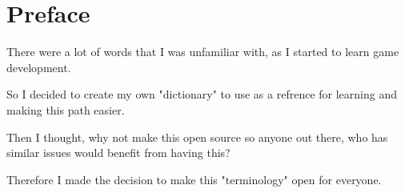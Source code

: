 \section{Preface}

There were a lot of words that I was unfamiliar with, as I started to learn game development.

So I decided to create my own "dictionary" to use as a refrence for
learning and making this path easier.

Then I thought, why not make this open source so anyone out there, who
has similar issues would benefit from having this?

Therefore I made the decision to make this "terminology" open for everyone.
